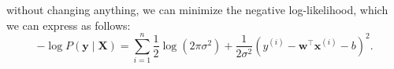 without changing anything, we can minimize the negative log-likelihood, which we can express as follows:
\[
    \displaystyle
    -\log P(\mathbf y \mid \mathbf X) = \sum_{i=1}^n \frac{1}{2} \log(2 \pi \sigma^2) + \frac{1}{2 \sigma^2} \left(y^{(i)} - \mathbf{w}^\top \mathbf{x}^{(i)} - b\right)^2.
\]






































